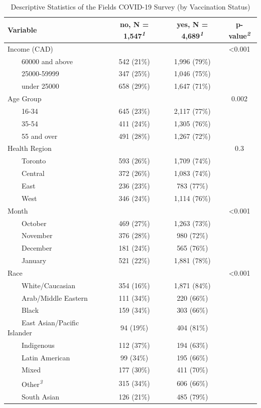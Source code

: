 \documentclass[
]{article}
\begin{document}
\hypertarget{tbl-descriptive-stats}{}
\setlength{\LTpost}{0mm}
\begin{longtable}{lccc}
\caption{\label{tbl-descriptive-stats}Descriptive Statistics of the Fields COVID-19 Survey (by Vaccination
Status) }\tabularnewline

\toprule
\textbf{Variable} & \textbf{no}, N = 1,547\textsuperscript{\textit{1}} & \textbf{yes}, N = 4,689\textsuperscript{\textit{1}} & \textbf{p-value}\textsuperscript{\textit{2}} \\ 
\midrule
Income (CAD) &  &  & <0.001 \\ 
    60000 and above & 542 (21\%) & 1,996 (79\%) &  \\ 
    25000-59999 & 347 (25\%) & 1,046 (75\%) &  \\ 
    under 25000 & 658 (29\%) & 1,647 (71\%) &  \\ 
Age Group &  &  & 0.002 \\ 
    16-34 & 645 (23\%) & 2,117 (77\%) &  \\ 
    35-54 & 411 (24\%) & 1,305 (76\%) &  \\ 
    55 and over & 491 (28\%) & 1,267 (72\%) &  \\ 
Health Region &  &  & 0.3 \\ 
    Toronto & 593 (26\%) & 1,709 (74\%) &  \\ 
    Central & 372 (26\%) & 1,083 (74\%) &  \\ 
    East & 236 (23\%) & 783 (77\%) &  \\ 
    West & 346 (24\%) & 1,114 (76\%) &  \\ 
Month &  &  & <0.001 \\ 
    October & 469 (27\%) & 1,263 (73\%) &  \\ 
    November & 376 (28\%) & 980 (72\%) &  \\ 
    December & 181 (24\%) & 565 (76\%) &  \\ 
    January & 521 (22\%) & 1,881 (78\%) &  \\ 
Race &  &  & <0.001 \\ 
    White/Caucasian & 354 (16\%) & 1,871 (84\%) &  \\ 
    Arab/Middle Eastern & 111 (34\%) & 220 (66\%) &  \\ 
    Black & 159 (34\%) & 303 (66\%) &  \\ 
    East Asian/Pacific Islander & 94 (19\%) & 404 (81\%) &  \\ 
    Indigenous & 112 (37\%) & 194 (63\%) &  \\ 
    Latin American & 99 (34\%) & 195 (66\%) &  \\ 
    Mixed & 177 (30\%) & 411 (70\%) &  \\ 
    Other\textsuperscript{\textit{3}} & 315 (34\%) & 606 (66\%) &  \\ 
    South Asian & 126 (21\%) & 485 (79\%) &  \\ 
\bottomrule
\end{longtable}
\end{document}
